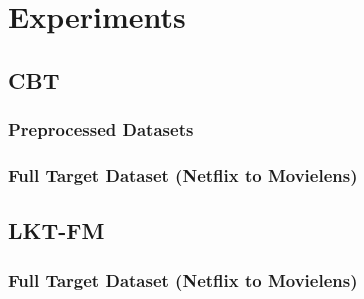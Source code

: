 \chapter{Experiments}
\label{ch:experiments}



\section{CBT}


\subsection{Preprocessed Datasets}


\subsection{Full Target Dataset (Netflix to Movielens)}



\section{LKT-FM}


\subsection{Full Target Dataset (Netflix to Movielens)}